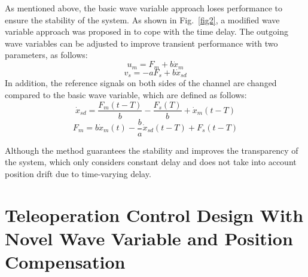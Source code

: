 As mentioned above,
the basic wave variable approach loses performance to ensure the stability of the system.
As shown in  Fig.~\ref{fig2},
a modified wave variable approach was proposed in \cite{b11} to cope with the time delay.
The outgoing wave variables can be adjusted to improve transient performance with two parameters,
as follows:
\begin{equation}
    u_m = F_m + b \dot x_m\label{eq5}
\end{equation}
\begin{equation}
    v_s = -aF_s + b \dot x_{sd}\label{eq6}
\end{equation}
In addition, the reference signals on both sides of the channel 
are changed compared to the basic wave variable,
which are defined as follows:
\begin{equation}
    \dot x_{sd}=\frac{F_m(t-T)}{b}-\frac{F_s(T)}{b}+\dot x_m(t-T)\label{eqA}
\end{equation}
\begin{equation}
    F_{m}=b\dot x_m(t)-\frac{b}{a}\dot x_{sd}(t-T)+F_s(t-T)\label{eqB}
\end{equation}
\par Although the method guarantees the stability
and improves the transparency of the system,
which only considers constant delay 
and does not take into account position drift due to time-varying delay.

\section{Teleoperation Control Design With Novel Wave Variable and Position Compensation}


